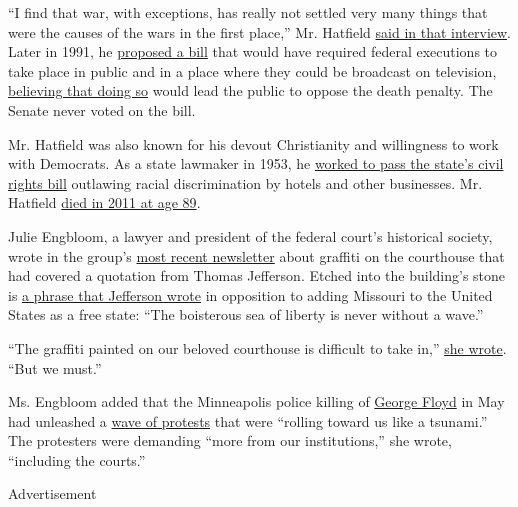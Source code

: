 ``I find that war, with exceptions, has really not settled very many
things that were the causes of the wars in the first place,'' Mr.
Hatfield \href{https://www.newspapers.com/newspage/442485597/}{said in
that interview}. Later in 1991, he
\href{https://www.congress.gov/bill/102nd-congress/senate-bill/1155}{proposed
a bill} that would have required federal executions to take place in
public and in a place where they could be broadcast on television,
\href{https://www.nytimes3xbfgragh.onion/1991/05/03/opinion/pictures-at-an-execution.html}{believing
that doing so} would lead the public to oppose the death penalty. The
Senate never voted on the bill.

Mr. Hatfield was also known for his devout Christianity and willingness
to work with Democrats. As a state lawmaker in 1953, he
\href{https://oregonhistoryproject.org/articles/historical-records/signing-oregon39s-civil-rights-bill-1953}{worked
to pass the state's civil rights bill} outlawing racial discrimination
by hotels and other businesses. Mr. Hatfield
\href{https://www.nytimes3xbfgragh.onion/2011/08/08/us/politics/08hatfield.html}{died
in 2011 at age 89}.

Julie Engbloom, a lawyer and president of the federal court's historical
society, wrote in the group's
\href{https://usdchs.org/wp-content/uploads/2020/07/benchmarks_spring2020_rev-final-web.pdf}{most
recent newsletter} about graffiti on the courthouse that had covered a
quotation from Thomas Jefferson. Etched into the building's stone is
\href{http://www.digitalhistory.uh.edu/disp_textbook.cfm?smtID=3\&psid=230}{a
phrase that Jefferson wrote} in opposition to adding Missouri to the
United States as a free state: ``The boisterous sea of liberty is never
without a wave.''

``The graffiti painted on our beloved courthouse is difficult to take
in,''
\href{https://usdchs.org/wp-content/uploads/2020/07/benchmarks_spring2020_rev-final-web.pdf}{she
wrote}. ``But we must.''

Ms. Engbloom added that the Minneapolis police killing of
\href{https://www.nytimes3xbfgragh.onion/article/george-floyd-who-is.html}{George
Floyd} in May had unleashed a
\href{https://www.nytimes3xbfgragh.onion/news-event/george-floyd-protests-minneapolis-new-york-los-angeles}{wave
of protests} that were ``rolling toward us like a tsunami.'' The
protesters were demanding ``more from our institutions,'' she wrote,
``including the courts.''

Advertisement

